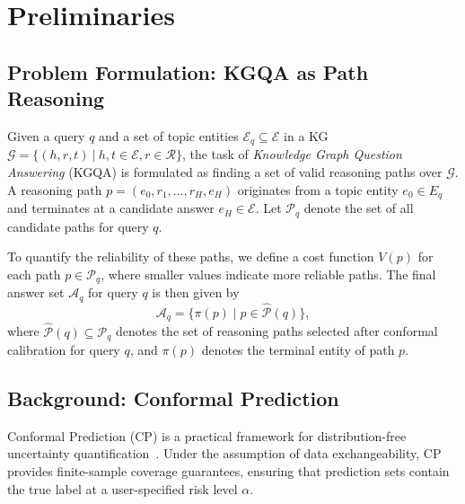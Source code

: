 \documentclass{article}
\theoremstyle{plain}
\theoremstyle{definition}
\theoremstyle{remark}
\begin{document}
\section{Preliminaries}

\subsection{Problem Formulation: KGQA as Path Reasoning}

Given a query $q$ and a set of topic entities $\mathcal{E}_q \subseteq \mathcal{E}$ in a KG $\mathcal{G}=\{(h, r, t)\ \vert\ h, t \in \mathcal{E}, r \in \mathcal{R}\}$, the task of \textit{Knowledge Graph Question Answering} (KGQA) is formulated as finding a set of valid reasoning paths over $\mathcal{G}$. A reasoning path $p = (e_0, r_1, \dots, r_H, e_H)$ originates from a topic entity $e_0 \in E_q$ and terminates at a candidate answer $e_H \in \mathcal{E}$. Let $\mathcal{P}_q$ denote the set of all candidate paths for query $q$. 

To quantify the reliability of these paths, we define a cost function $V(p)$ for each path $p \in \mathcal{P}_q$, where smaller values indicate more reliable paths. The final answer set $\mathcal{A}_q$ for query $q$ is then given by 
\begin{equation}
\mathcal{A}_q = \{ \pi(p) \mid p \in \hat{\mathcal{P}}(q) \}, \nonumber
\end{equation}
where $\hat{\mathcal{P}}(q) \subseteq \mathcal{P}_q$ denotes the set of reasoning paths selected after conformal calibration for query $q$, and $\pi(p)$ denotes the terminal entity of path $p$.

\subsection{Background: Conformal Prediction}
Conformal Prediction (CP) is a practical framework for distribution-free uncertainty quantification~\citep{cp_intro}. Under the assumption of data exchangeability, CP provides finite-sample coverage guarantees, ensuring that prediction sets contain the true label at a user-specified risk level $\alpha$. 
\end{document}
